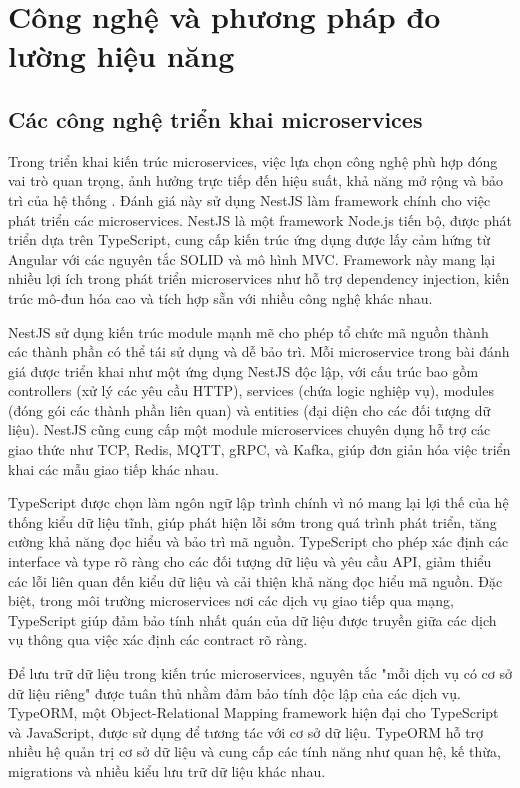 \section{Công nghệ và phương pháp đo lường hiệu năng}

\subsection{Các công nghệ triển khai microservices}
Trong triển khai kiến trúc microservices, việc lựa chọn công nghệ phù hợp đóng vai trò quan trọng, ảnh hưởng trực tiếp đến hiệu suất, khả năng mở rộng và bảo trì của hệ thống \cite{newman2015}. Đánh giá này sử dụng NestJS làm framework chính cho việc phát triển các microservices. NestJS là một framework Node.js tiến bộ, được phát triển dựa trên TypeScript, cung cấp kiến trúc ứng dụng được lấy cảm hứng từ Angular với các nguyên tắc SOLID và mô hình MVC. Framework này mang lại nhiều lợi ích trong phát triển microservices như hỗ trợ dependency injection, kiến trúc mô-đun hóa cao và tích hợp sẵn với nhiều công nghệ khác nhau.

NestJS sử dụng kiến trúc module mạnh mẽ cho phép tổ chức mã nguồn thành các thành phần có thể tái sử dụng và dễ bảo trì. Mỗi microservice trong bài đánh giá được triển khai như một ứng dụng NestJS độc lập, với cấu trúc bao gồm controllers (xử lý các yêu cầu HTTP), services (chứa logic nghiệp vụ), modules (đóng gói các thành phần liên quan) và entities (đại diện cho các đối tượng dữ liệu). NestJS cũng cung cấp một module microservices chuyên dụng hỗ trợ các giao thức như TCP, Redis, MQTT, gRPC, và Kafka, giúp đơn giản hóa việc triển khai các mẫu giao tiếp khác nhau.

TypeScript được chọn làm ngôn ngữ lập trình chính vì nó mang lại lợi thế của hệ thống kiểu dữ liệu tĩnh, giúp phát hiện lỗi sớm trong quá trình phát triển, tăng cường khả năng đọc hiểu và bảo trì mã nguồn. TypeScript cho phép xác định các interface và type rõ ràng cho các đối tượng dữ liệu và yêu cầu API, giảm thiểu các lỗi liên quan đến kiểu dữ liệu và cải thiện khả năng đọc hiểu mã nguồn. Đặc biệt, trong môi trường microservices nơi các dịch vụ giao tiếp qua mạng, TypeScript giúp đảm bảo tính nhất quán của dữ liệu được truyền giữa các dịch vụ thông qua việc xác định các contract rõ ràng.

Để lưu trữ dữ liệu trong kiến trúc microservices, nguyên tắc "mỗi dịch vụ có cơ sở dữ liệu riêng" được tuân thủ nhằm đảm bảo tính độc lập của các dịch vụ. TypeORM, một Object-Relational Mapping framework hiện đại cho TypeScript và JavaScript, được sử dụng để tương tác với cơ sở dữ liệu. TypeORM hỗ trợ nhiều hệ quản trị cơ sở dữ liệu và cung cấp các tính năng như quan hệ, kế thừa, migrations và nhiều kiểu lưu trữ dữ liệu khác nhau.


